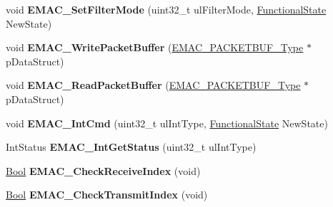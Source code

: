 \begin{DoxyCompactItemize}
\item 
\hypertarget{group___e_m_a_c___public___functions_ga1630baff6eedc70bf2f8fb328c7006ac}{void {\bfseries \-E\-M\-A\-C\-\_\-\-Set\-Filter\-Mode} (uint32\-\_\-t ul\-Filter\-Mode, \hyperlink{group___l_p_c___types___public___types_gac9a7e9a35d2513ec15c3b537aaa4fba1}{\-Functional\-State} \-New\-State)}\label{group___e_m_a_c___public___functions_ga1630baff6eedc70bf2f8fb328c7006ac}

\item 
\hypertarget{group___e_m_a_c___public___functions_ga8fc32da8e4f741a7806fa5639033675a}{void {\bfseries \-E\-M\-A\-C\-\_\-\-Write\-Packet\-Buffer} (\hyperlink{struct_e_m_a_c___p_a_c_k_e_t_b_u_f___type}{\-E\-M\-A\-C\-\_\-\-P\-A\-C\-K\-E\-T\-B\-U\-F\-\_\-\-Type} $\ast$p\-Data\-Struct)}\label{group___e_m_a_c___public___functions_ga8fc32da8e4f741a7806fa5639033675a}

\item 
\hypertarget{group___e_m_a_c___public___functions_gaadcaada06e8146cf923866b5a4858724}{void {\bfseries \-E\-M\-A\-C\-\_\-\-Read\-Packet\-Buffer} (\hyperlink{struct_e_m_a_c___p_a_c_k_e_t_b_u_f___type}{\-E\-M\-A\-C\-\_\-\-P\-A\-C\-K\-E\-T\-B\-U\-F\-\_\-\-Type} $\ast$p\-Data\-Struct)}\label{group___e_m_a_c___public___functions_gaadcaada06e8146cf923866b5a4858724}

\item 
\hypertarget{group___e_m_a_c___public___functions_gade86e1c12cf6678f85aac23af5b466d6}{void {\bfseries \-E\-M\-A\-C\-\_\-\-Int\-Cmd} (uint32\-\_\-t ul\-Int\-Type, \hyperlink{group___l_p_c___types___public___types_gac9a7e9a35d2513ec15c3b537aaa4fba1}{\-Functional\-State} \-New\-State)}\label{group___e_m_a_c___public___functions_gade86e1c12cf6678f85aac23af5b466d6}

\item 
\hypertarget{group___e_m_a_c___public___functions_gaea8abd458e53a9494a8deaca0289e051}{\-Int\-Status {\bfseries \-E\-M\-A\-C\-\_\-\-Int\-Get\-Status} (uint32\-\_\-t ul\-Int\-Type)}\label{group___e_m_a_c___public___functions_gaea8abd458e53a9494a8deaca0289e051}

\item 
\hypertarget{group___e_m_a_c___public___functions_gab72129f5498cfae3f71e2f7b813c09ed}{\hyperlink{group___l_p_c___types___public___types_ga39db6982619d623273fad8a383489309}{\-Bool} {\bfseries \-E\-M\-A\-C\-\_\-\-Check\-Receive\-Index} (void)}\label{group___e_m_a_c___public___functions_gab72129f5498cfae3f71e2f7b813c09ed}

\item 
\hypertarget{group___e_m_a_c___public___functions_ga1283c688522f56d206c045e4c752b588}{\hyperlink{group___l_p_c___types___public___types_ga39db6982619d623273fad8a383489309}{\-Bool} {\bfseries \-E\-M\-A\-C\-\_\-\-Check\-Transmit\-Index} (void)}\label{group___e_m_a_c___public___functions_ga1283c688522f56d206c045e4c752b588}


\end{DoxyCompactItemize}
